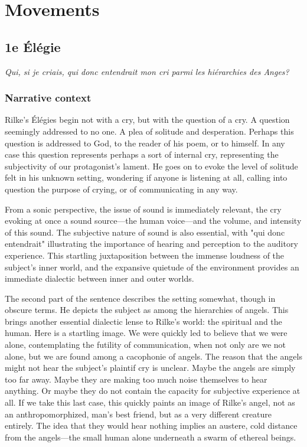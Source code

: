 \documentclass[12pt,twoside,maitrise]{dms}
\theoremstyle{definition}
\numberwithin{equation}{section}
\numberwithin{table}{chapter}
\numberwithin{figure}{chapter}
\begin{document}
\section{Movements}
\anglais
\subsection{1e Élégie}

\epigraph{\textit{Qui, si je criais, qui donc entendrait mon cri parmi les hiérarchies des Anges?}}{}

\subsubsection{Narrative context}
Rilke's Élégies begin not with a cry, but with the question of a cry. A question seemingly addressed to no one. A plea of solitude and desperation. Perhaps this question is addressed to God, to the reader of his poem, or to himself. In any case this question represents perhaps a sort of internal cry, representing the subjectivity of our protagonist's lament. He goes on to evoke the level of solitude felt in his unknown setting, wondering if anyone is listening at all, calling into question the purpose of crying, or of communicating in any way.

From a sonic perspective, the issue of sound is immediately relevant, the cry evoking at once a sound source---the human voice---and the volume, and intensity of this sound. The subjective nature of sound is also essential, with "qui donc entendrait" illustrating the importance of hearing and perception to the auditory experience. This startling juxtaposition between the immense loudness of the subject's inner world, and the expansive quietude of the environment provides an immediate dialectic between inner and outer worlds.

The second part of the sentence describes the setting somewhat, though in obscure terms. He depicts the subject as among the hierarchies of angels. This brings another essential dialectic lense to Rilke's world: the spiritual and the human. Here is a startling image. We were quickly led to believe that we were alone, contemplating the futility of communication, when not only are we not alone, but we are found among a cacophonie of angels. The reason that the angels might not hear the subject's plaintif cry is unclear. Maybe the angels are simply too far away. Maybe they are making too much noise themselves to hear anything. Or maybe they do not contain the capacity for subjective experience at all. If we take this last case, this quickly paints an image of Rilke's angel, not as an anthropomorphized, man's best friend, but as a very different creature entirely. The idea that they would hear nothing implies an austere, cold distance from the angels---the small human alone underneath a swarm of ethereal beings.
\end{document}
